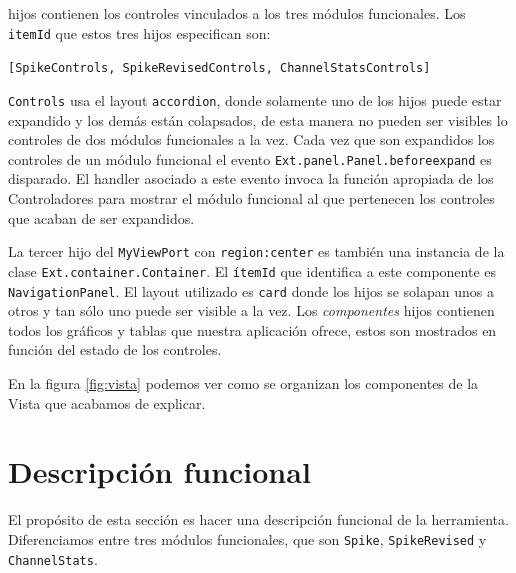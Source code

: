	hijos contienen los controles vinculados a los tres módulos funcionales. Los \texttt{itemId} que estos tres hijos especifican son:
    		\begin{center} \texttt{[SpikeControls, SpikeRevisedControls, ChannelStatsControls]}  \end{center}
	\texttt{Controls} usa el layout \texttt{accordion}, donde solamente uno de los hijos puede estar expandido y los demás están
	colapsados, de esta manera no pueden ser visibles lo controles de dos módulos funcionales a la vez. Cada vez que son expandidos los
	controles de un módulo funcional el evento \texttt{Ext.panel.Panel.beforeexpand} es disparado. El handler asociado a este evento
	invoca la función apropiada de los Controladores para mostrar el módulo funcional al que pertenecen los controles que acaban de ser
	expandidos.
	\par
	La tercer hijo del \texttt{MyViewPort} con \texttt{region:center} es también una instancia de la clase \texttt{Ext.container.Container}. El
	\texttt{ítemId} que identifica a este componente es \texttt{NavigationPanel}. El layout utilizado es \texttt{card} donde los hijos se solapan
	unos a otros y tan sólo uno puede ser visible a la vez. Los \emph{componentes} hijos contienen todos los gráficos y tablas que nuestra
	aplicación ofrece, estos son mostrados en función del estado de los controles.
	\par
	En la figura \ref{fig:vista} podemos ver como se organizan los componentes de la Vista que acabamos de explicar.
\section{Descripción funcional}
	El propósito de esta sección es hacer una descripción funcional de la herramienta. Diferenciamos entre tres módulos funcionales, que son
	\texttt{Spike}, \texttt{SpikeRevised} y \texttt{ChannelStats}.
